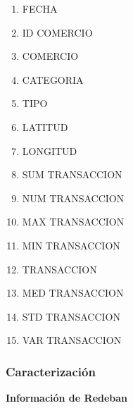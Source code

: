 \documentclass[a4paper]{article}
\begin{document}
\begin{multicols}{2}
	\begin{enumerate}
		\item FECHA
		\item ID COMERCIO
		\item COMERCIO
		\item CATEGORIA
		\item TIPO
		\item LATITUD
		\item LONGITUD
		\item SUM TRANSACCION
		\item NUM TRANSACCION
		\item MAX TRANSACCION
		\item MIN TRANSACCION
		\item TRANSACCION
		\item MED TRANSACCION
		\item STD TRANSACCION
		\item VAR TRANSACCION
	\end{enumerate}
\end{multicols}

\subsubsection{Caracterización}

\textbf{Información de Redeban}
\end{document}
